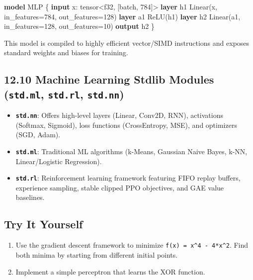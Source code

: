 \documentclass[
  english,
]{book}
\newenvironment{Shaded}{\begin{snugshade}}{\end{snugshade}}
\newcommand{\DataTypeTok}[1]{\textcolor[rgb]{0.31,0.79,0.69}{#1}}
\newcommand{\DecValTok}[1]{\textcolor[rgb]{0.71,0.81,0.66}{#1}}
\newcommand{\KeywordTok}[1]{\textcolor[rgb]{0.34,0.61,0.84}{\textbf{#1}}}
\newcommand{\NormalTok}[1]{\textcolor[rgb]{0.83,0.83,0.83}{#1}}
\newcommand{\OperatorTok}[1]{\textcolor[rgb]{0.83,0.83,0.83}{#1}}
\providecommand{\tightlist}{%
  \setlength{\itemsep}{0pt}\setlength{\parskip}{0pt}}
\begin{document}
\begin{Shaded}
\begin{Highlighting}[]
\KeywordTok{model}\NormalTok{ MLP \{}
    \KeywordTok{input}\NormalTok{ x: }\DataTypeTok{tensor}\OperatorTok{\textless{}}\DataTypeTok{f32}\NormalTok{, [batch, }\DecValTok{784}\NormalTok{]}\OperatorTok{\textgreater{}}
    \KeywordTok{layer}\NormalTok{ h1 Linear(x, in\_features}\OperatorTok{=}\DecValTok{784}\NormalTok{, out\_features}\OperatorTok{=}\DecValTok{128}\NormalTok{)}
    \KeywordTok{layer}\NormalTok{ a1 ReLU(h1)}
    \KeywordTok{layer}\NormalTok{ h2 Linear(a1, in\_features}\OperatorTok{=}\DecValTok{128}\NormalTok{, out\_features}\OperatorTok{=}\DecValTok{10}\NormalTok{)}
    \KeywordTok{output}\NormalTok{ h2}
\NormalTok{\}}
\end{Highlighting}
\end{Shaded}

This model is compiled to highly efficient vector/SIMD instructions and
exposes standard weights and biases for training.

\subsection{\texorpdfstring{12.10 Machine Learning Stdlib Modules
(\texttt{std.ml}, \texttt{std.rl},
\texttt{std.nn})}{12.10 Machine Learning Stdlib Modules (std.ml, std.rl, std.nn)}}\label{machine-learning-stdlib-modules-std.ml-std.rl-std.nn}

\begin{itemize}
\tightlist
\item
  \textbf{\texttt{std.nn}}: Offers high-level layers (Linear, Conv2D,
  RNN), activations (Softmax, Sigmoid), loss functions (CrossEntropy,
  MSE), and optimizers (SGD, Adam).
\item
  \textbf{\texttt{std.ml}}: Traditional ML algorithms (k-Means, Gaussian
  Naive Bayes, k-NN, Linear/Logistic Regression).
\item
  \textbf{\texttt{std.rl}}: Reinforcement learning framework featuring
  FIFO replay buffers, experience sampling, stable clipped PPO
  objectives, and GAE value baselines.
\end{itemize}

\subsection{Try It Yourself}\label{try-it-yourself-11}

\begin{enumerate}
\def\labelenumi{\arabic{enumi}.}
\tightlist
\item
  Use the gradient descent framework to minimize
  \texttt{f(x)\ =\ x\^{}4\ -\ 4*x\^{}2}. Find both minima by starting
  from different initial points.
\item
  Implement a simple perceptron that learns the XOR function.
\end{enumerate}
\end{document}
